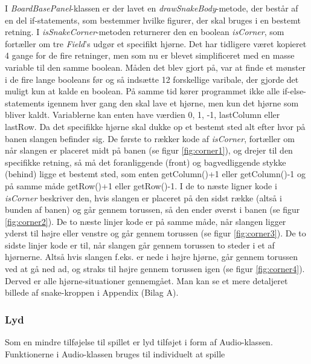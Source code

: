 I \textit{BoardBasePanel}-klassen er der lavet en \textit{drawSnakeBody}-metode, der består af en del if-statements, som bestemmer hvilke figurer, der skal bruges i en bestemt retning. I \textit{isSnakeCorner}-metoden returnerer den en boolean \textit{isCorner}, som fortæller om tre \textit{Field}'s udgør et specifikt hjørne.  Det har tidligere været kopieret 4 gange for de fire retninger, men som nu er blevet simplificeret med en masse variable til den samme boolean. Måden det blev gjort på, var at finde et mønster i de fire lange booleans før og så indsætte 12 forskellige varibale, der gjorde det muligt kun at kalde en boolean. På samme tid kører programmet ikke alle if-else-statements igennem hver gang den skal lave et hjørne, men kun det hjørne som bliver kaldt. Variablerne kan enten have værdien 0, 1, -1, lastColumn eller lastRow. Da det specifikke hjørne skal dukke op et bestemt sted alt efter hvor på banen slangen befinder sig.
De første to rækker kode af \textit{isCorner}, fortæller om når slangen er placeret midt på banen (se figur \ref{fig:corner1}), og drejer til den specifikke retning, så må det foranliggende (front) og bagvedliggende stykke (behind) ligge et bestemt sted, som enten getColumn()+1 eller getColumn()-1 og på samme måde getRow()+1 eller getRow()-1. I de to næste ligner kode i \textit{isCorner} beskriver den, hvis slangen er placeret på den sidst række (altså i bunden af banen) og går gennem torussen, så den ender øverst i banen (se figur \ref{fig:corner2}).
De to næste linjer kode er på samme måde, når slangen ligger yderst til højre eller venstre og går gennem torussen (se figur \ref{fig:corner3}).
De to sidste linjer kode er til, når slangen går gennem torussen to steder i et af hjørnerne. Altså hvis slangen f.eks. er nede i højre hjørne, går gennem torussen ved at gå ned ad, og straks til højre gennem torussen igen (se figur \ref{fig:corner4}). 
Derved er alle hjørne-situationer gennemgået.
Man kan se et mere detaljeret billede af snake-kroppen i Appendix (Bilag A).
\begin{figure}[h]
	\centering
	\graphicspath{ {pics/} }
	\caption{}
	\hspace{0.05\textwidth}
	\hspace{0.05\textwidth}
	\hspace{0.05\textwidth}
\end{figure}

\subsubsection{Lyd}

Som en mindre tilføjelse til spillet er lyd tilføjet i form af Audio-klassen. Funktionerne i Audio-klassen bruges til individuelt at spille 	
